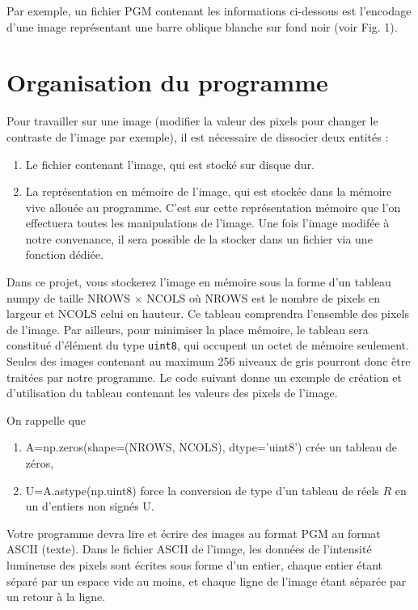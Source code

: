 \documentclass[a4paper, 10pt]{article}
\begin{document}
Par exemple, un fichier PGM contenant les informations ci-dessous est l’encodage d’une image représentant une barre oblique blanche sur fond noir (voir Fig. 1). 



\section{Organisation du programme}

Pour travailler sur une image (modifier la valeur des pixels pour changer le contraste de l'image par exemple), il est nécessaire de dissocier deux entités :
\begin{enumerate} 
\item Le fichier contenant l'image, qui est stocké sur disque dur.
\item La représentation en mémoire de l'image, qui est stockée dans la mémoire vive allouée au programme. C'est sur cette représentation mémoire que l'on effectuera toutes les manipulations de l'image. Une fois l'image modifée à notre convenance, il sera possible de la stocker dans un fichier via une fonction dédiée.
\end{enumerate} 

Dans ce projet, vous stockerez l'image en mémoire sous la forme d'un tableau numpy 
de taille NROWS $\times$ NCOLS où NROWS est le nombre de pixels en largeur et NCOLS celui
en hauteur. Ce tableau comprendra l'ensemble des pixels de l'image. 
Par ailleurs, pour minimiser la place mémoire, le tableau sera constitué d'élément du type {\tt uint8}, qui occupent un octet de mémoire seulement. 
Seules des images contenant au maximum 256 niveaux de gris pourront donc être traitées par notre programme. Le code suivant donne un exemple de création et d'utilisation du tableau contenant les valeurs des pixels de l'image.

On rappelle que
\begin{enumerate}  
\item  A=np.zeros(shape=(NROWS, NCOLS), dtype='uint8')
crée un tableau de zéros,
\item  U=A.astype(np.uint8) force la conversion de type
d'un tableau de réels $R$ en un d'entiers non signés U.
\end{enumerate} 

Votre programme devra lire et écrire des images au format PGM au format ASCII (texte).
Dans le fichier ASCII de l'image, les données de l'intensité lumineuse des pixels sont 
écrites sous forme d'un entier, 
chaque entier étant séparé par un espace  vide au moins, et chaque ligne de l'image étant séparée par un retour à la ligne.
\end{document}
